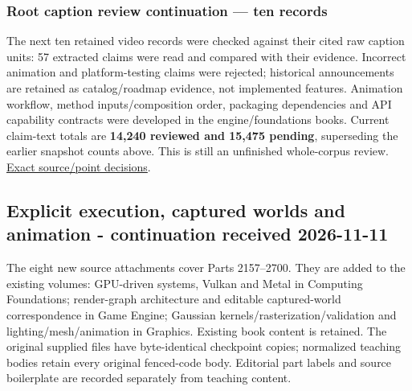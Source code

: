 \subsubsection{Root caption review continuation --- ten records}\label{appendix-3b67654799a2-root-caption-review-continuation-ten-records}

The next ten retained video records were checked against their cited raw caption units: 57 extracted claims were read and compared with their evidence. Incorrect animation and platform-testing claims were rejected; historical announcements are retained as catalog/roadmap evidence, not implemented features. Animation workflow, method inputs/composition order, packaging dependencies and API capability contracts were developed in the engine/foundations books. Current claim-text totals are \textbf{14,240 reviewed and 15,475 pending}, superseding the earlier snapshot counts above. This is still an unfinished whole-corpus review. \hyperref[source-file-02ebf2c2c2c38aae0035fc9f]{Exact source/point decisions}.

\subsection{Explicit execution, captured worlds and animation - continuation received 2026-11-11}\label{appendix-3b67654799a2-explicit-execution-captured-worlds-and-animation---continuation-received-2026-11-11}

The eight new source attachments cover Parts 2157--2700. They are added to the existing volumes: GPU-driven systems, Vulkan and Metal in Computing Foundations; render-graph architecture and editable captured-world correspondence in Game Engine; Gaussian kernels/rasterization/validation and lighting/mesh/animation in Graphics. Existing book content is retained. The original supplied files have byte-identical checkpoint copies; normalized teaching bodies retain every original fenced-code body. Editorial part labels and source boilerplate are recorded separately from teaching content.

